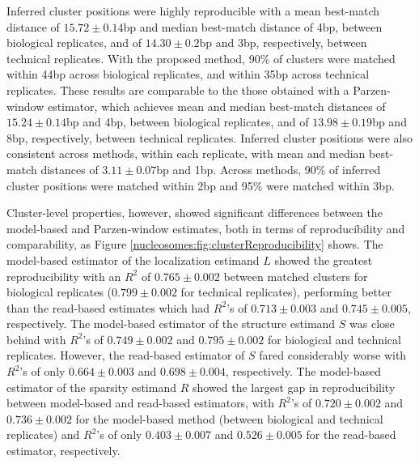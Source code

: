 Inferred cluster positions were highly reproducible with a mean best-match distance of $15.72\pm0.14$bp and median best-match distance of 4bp, between biological replicates, and of $14.30\pm0.2$bp and 3bp, respectively, between technical replicates.
With the proposed method, 90\% of clusters were matched within 44bp across biological replicates, and within 35bp across technical replicates.
These results are comparable to the those obtained with a Parzen-window estimator, which achieves mean and median best-match distances of $15.24\pm0.14$bp and 4bp, between biological replicates, and of $13.98\pm0.19$bp and 8bp, respectively, between technical replicates.
Inferred cluster positions were also consistent across methods, within each replicate, with mean and median best-match distances of $3.11\pm0.07$bp and 1bp.
Across methods, 90\% of inferred cluster positions were matched within 2bp and 95\% were matched within 3bp.

Cluster-level properties, however, showed significant differences between the model-based and Parzen-window estimates, both in terms of reproducibility and comparability, as Figure \ref{nucleosomes:fig:clusterReproducibility} shows.
%
The model-based estimator of the localization estimand $L$
 showed the greatest reproducibility with an $R^2$ of $0.765\pm0.002$ between matched clusters for biological replicates ($0.799\pm0.002$ for technical replicates), performing  better than the read-based estimates which had $R^2$'s of $0.713\pm0.003$ and $0.745\pm0.005$, respectively.
%
The model-based estimator of the structure estimand $S$
 was close behind with $R^2$'s of $0.749\pm0.002$ and $0.795\pm0.002$ for biological and technical replicates.
However, the read-based estimator of $S$ fared considerably worse with $R^2$'s of only $0.664\pm0.003$ and $0.698\pm0.004$, respectively.
%
The model-based estimator of the sparsity estimand $R$ showed the largest gap in reproducibility between model-based and read-based estimators, with $R^2$'s of $0.720\pm0.002$ and $0.736\pm0.002$ for the model-based method (between biological and technical replicates) and $R^2$'s of only $0.403\pm0.007$ and $0.526\pm0.005$ for the read-based estimator, respectively.

